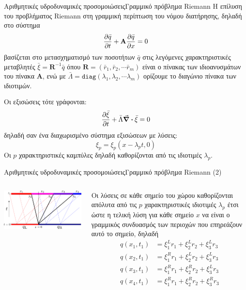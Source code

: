 \documentclass{beamer}
\begin{document}
\begin{frame}{Αριθμητικές υδροδυναμικές προσομοιώσεις}{Γραμμικό πρόβλημα Riemann}
	Η επίλυση του προβλήματος Riemann στη γραμμική περίπτωση του νόμου διατήρησης, δηλαδή στο σύστημα
	\begin{equation}
	\pdv{\bar{q}}{t} +  \mathbf{A}\pdv{\bar{q}}{x}  = 0 
	\end{equation}
	βασίζεται στο μετασχηματισμό των ποσοτήτων $\bar{q}$ στις λεγόμενες χαρακτηριστικές μεταβλητές $\bar{\xi}=\mathbf{R}^{-1}\bar{q}$ όπου $\mathbf{R}=(\bar{r}_1,\bar{r}_2,\cdots \bar{r}_m)$ είναι ο πίνακας των ιδιοανυσμάτων του πίνακα $\mathbf{A}$, ενώ με $\bar{\Lambda}=\mathtt{diag}(\lambda _1,\lambda _2,\cdots \lambda _m)$ ορίζουμε το διαγώνιο πίνακα των ιδιοτιμών.
	
	Οι εξισώσεις τότε γράφονται:
	\begin{equation}
	\pdv{\bar{\xi}}{t} + \bar{\Lambda} \div\bar{\xi} =0
	\end{equation} 
	δηλαδή σαν ένα διαχωρισμένο σύστημα εξισώσεων με λύσεις:
	\begin{equation}
	\label{eq:xi_solution}
	\xi_p  = \xi_p(x-\lambda _p t,0) 
	\end{equation}
	Οι $p$ χαρακτηριστικές καμπύλες δηλαδή καθορίζονται από τις ιδιοτιμές $\lambda _p$.
\end{frame}


\begin{frame}{Αριθμητικές υδροδυναμικές προσομοιώσεις}{Γραμμικό πρόβλημα Riemann (2)}
	
\begin{columns}
	\begin{center}
		\includegraphics[width=1\linewidth]{../Document/Images/reimannlinear}
	\end{center}
Οι λύσεις σε κάθε σημείο του χώρου καθορίζονται απόλυτα από τις $p$ χαρακτηριστικές ιδιοτιμές $\lambda _p$ έτσι ώστε η τελική λύση για κάθε σημείο $x$ να είναι ο γραμμικός συνδυασμός των περιοχών που επηρεάζουν αυτό το σημείο, δηλαδή
\begin{align*}
q(x_1,t_1)&=\xi _1 ^L r_1 +\xi _2 ^L r_2 + \xi _3 ^L r_3 \\
q(x_2,t_1)&=\xi _1 ^R r_1 +\xi _2 ^L r_2 + \xi _3 ^L r_3 \\
q(x_3,t_1)&=\xi _1 ^R r_1 +\xi _2 ^R r_2 + \xi _3 ^L r_3 \\
q(x_4,t_1)&=\xi _1 ^R r_1 +\xi _2 ^R r_2 + \xi _3 ^R r_3 
\end{align*} 
\end{columns}
\end{frame}
\end{document}
